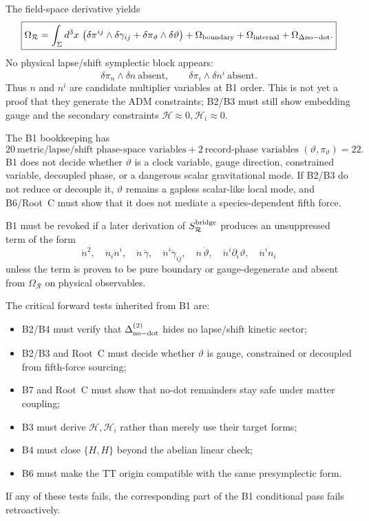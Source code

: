\documentclass[11pt]{article}
\begin{document}
The field-space derivative yields
\[
\boxed{
\Omega_{\mathcal R}
=\int_\Sigma d^3x\,
\left(
\delta\pi^{ij}\wedge\delta\gamma_{ij}
+\delta\pi_\vartheta\wedge\delta\vartheta
\right)
+\Omega_{\rm boundary}
+\Omega_{\rm internal}
+\Omega_{\Delta{\rm no-dot}}.
}
\]
No physical lapse/shift symplectic block appears:
\[
\boxed{
\delta\pi_n\wedge\delta n\ \text{absent},\qquad
\delta\pi_i\wedge\delta n^i\ \text{absent}.
}
\]
Thus \(n\) and \(n^i\) are candidate multiplier variables at B1 order.  This
is not yet a proof that they generate the ADM constraints; B2/B3 must still
show embedding gauge and the secondary constraints
\(\mathcal H\approx0,\mathcal H_i\approx0\).

The B1 bookkeeping has
\[
\boxed{
20\ \text{metric/lapse/shift phase-space variables}
+2\ \text{record-phase variables }(\vartheta,\pi_\vartheta)=22.
}
\]
B1 does not decide whether \(\vartheta\) is a clock variable, gauge direction,
constrained variable, decoupled phase, or a dangerous scalar gravitational
mode.  If B2/B3 do not reduce or decouple it, \(\vartheta\) remains a gapless
scalar-like local mode, and B6/Root~C must show that it does not mediate a
species-dependent fifth force.

B1 must be revoked if a later derivation of \(S_{\mathcal R}^{\rm bridge}\)
produces an unsuppressed term of the form
\[
\boxed{
\dot n^2,\quad
\dot n_i\dot n^i,\quad
\dot n\,\dot\gamma,\quad
\dot n^i\dot\gamma_{ij},\quad
\dot n\,\dot\vartheta,\quad
\dot n^i\partial_i\vartheta,\quad
\dot n^i n_i
}
\]
unless the term is proven to be pure boundary or gauge-degenerate and absent
from \(\Omega_{\mathcal R}\) on physical observables.

The critical forward tests inherited from B1 are:
\begin{itemize}
\item B2/B4 must verify that \(\Delta_{\rm no-dot}^{(2)}\) hides no
  lapse/shift kinetic sector;
\item B2/B3 and Root~C must decide whether \(\vartheta\) is gauge, constrained
  or decoupled from fifth-force sourcing;
\item B7 and Root~C must show that no-dot remainders stay safe under matter
  coupling;
\item B3 must derive \(\mathcal H,\mathcal H_i\) rather than merely use their
  target forms;
\item B4 must close \(\{H,H\}\) beyond the abelian linear check;
\item B6 must make the TT origin compatible with the same presymplectic form.
\end{itemize}
If any of these tests fails, the corresponding part of the B1 conditional pass
fails retroactively.
\end{document}
